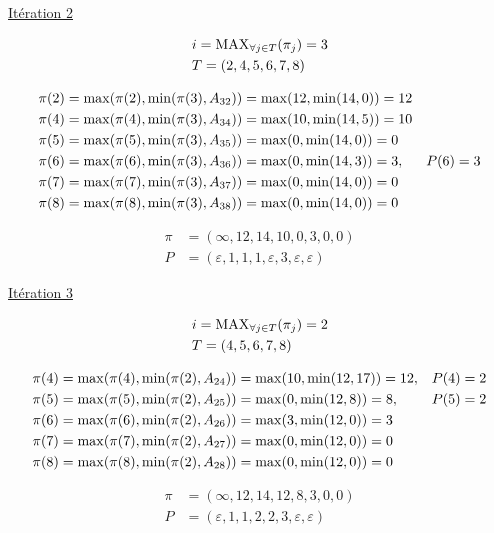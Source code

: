 \documentclass{article}
\begin{document}
\underline{Itération 2}

\begin{align*}
  &i = \operatorname{MAX}_{\forall j \in T}(\pi_j) = 3\\
  &T = (2,4,5,6,7,8)
\end{align*}

\begin{align*}
  &\pi(2) = \operatorname{max}(\pi(2), \operatorname{min}(\pi(3), A_{32})) = \operatorname{max}(12, \operatorname{min}(14,0)) = 12\\
  &\pi(4) = \operatorname{max}(\pi(4), \operatorname{min}(\pi(3), A_{34})) = \operatorname{max}(10, \operatorname{min}(14,5)) = 10\\
  &\pi(5) = \operatorname{max}(\pi(5), \operatorname{min}(\pi(3), A_{35})) = \operatorname{max}(0, \operatorname{min}(14,0)) = 0\\
  &\pi(6) = \operatorname{max}(\pi(6), \operatorname{min}(\pi(3), A_{36})) = \operatorname{max}(0, \operatorname{min}(14,3)) = 3, &P(6) = 3\\
  &\pi(7) = \operatorname{max}(\pi(7), \operatorname{min}(\pi(3), A_{37})) = \operatorname{max}(0, \operatorname{min}(14,0)) = 0\\
  &\pi(8) = \operatorname{max}(\pi(8), \operatorname{min}(\pi(3), A_{38})) = \operatorname{max}(0, \operatorname{min}(14,0)) = 0
\end{align*}

\begin{align*}
  \pi &= (\infty,12,14,10,0,3,0,0)\\
  P &= (\varepsilon, 1, 1, 1, \varepsilon, 3, \varepsilon, \varepsilon)
\end{align*}

\underline{Itération 3}

\begin{align*}
  &i = \operatorname{MAX}_{\forall j \in T}(\pi_j) = 2\\
  &T = (4,5,6,7,8)
\end{align*}

\begin{align*}
  &\pi(4) = \operatorname{max}(\pi(4), \operatorname{min}(\pi(2), A_{24})) = \operatorname{max}(10, \operatorname{min}(12,17)) = 12, &P(4) = 2\\
  &\pi(5) = \operatorname{max}(\pi(5), \operatorname{min}(\pi(2), A_{25})) = \operatorname{max}(0, \operatorname{min}(12,8)) = 8, &P(5) = 2\\
  &\pi(6) = \operatorname{max}(\pi(6), \operatorname{min}(\pi(2), A_{26})) = \operatorname{max}(3, \operatorname{min}(12,0)) = 3\\
  &\pi(7) = \operatorname{max}(\pi(7), \operatorname{min}(\pi(2), A_{27})) = \operatorname{max}(0, \operatorname{min}(12,0)) = 0\\
  &\pi(8) = \operatorname{max}(\pi(8), \operatorname{min}(\pi(2), A_{28})) = \operatorname{max}(0, \operatorname{min}(12,0)) = 0
\end{align*}

\begin{align*}
  \pi &= (\infty,12,14,12,8,3,0,0)\\
  P &= (\varepsilon, 1, 1, 2, 2, 3, \varepsilon, \varepsilon)
\end{align*}
\end{document}
